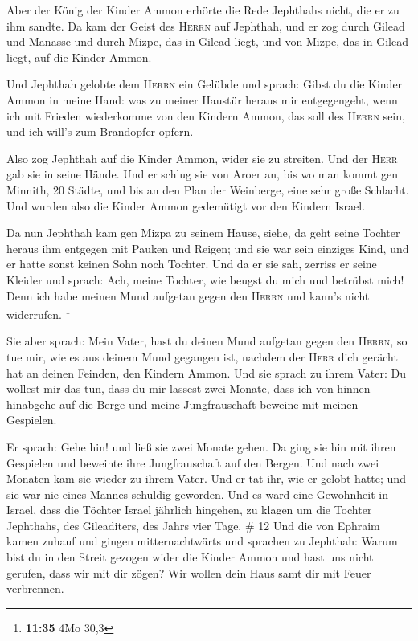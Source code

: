  Aber der König der Kinder Ammon erhörte die Rede
Jephthahs nicht, die er zu ihm sandte.  Da kam der Geist
des \textsc{Herrn} auf Jephthah, und er zog durch Gilead und Manasse und
durch Mizpe, das in Gilead liegt, und von Mizpe, das in Gilead liegt,
auf die Kinder Ammon.

 Und Jephthah gelobte dem \textsc{Herrn} ein Gelübde und
sprach: Gibst du die Kinder Ammon in meine Hand:  was zu
meiner Haustür heraus mir entgegengeht, wenn ich mit Frieden wiederkomme
von den Kindern Ammon, das soll des \textsc{Herrn} sein, und ich will's
zum Brandopfer opfern.

 Also zog Jephthah auf die Kinder Ammon, wider sie zu
streiten. Und der \textsc{Herr} gab sie in seine Hände. 
Und er schlug sie von Aroer an, bis wo man kommt gen Minnith, 20 Städte,
und bis an den Plan der Weinberge, eine sehr große Schlacht. Und wurden
also die Kinder Ammon gedemütigt vor den Kindern Israel.

 Da nun Jephthah kam gen Mizpa zu seinem Hause, siehe, da
geht seine Tochter heraus ihm entgegen mit Pauken und Reigen; und sie
war sein einziges Kind, und er hatte sonst keinen Sohn noch Tochter.
 Und da er sie sah, zerriss er seine Kleider und sprach:
Ach, meine Tochter, wie beugst du mich und betrübst mich! Denn ich habe
meinen Mund aufgetan gegen den \textsc{Herrn} und kann's nicht
widerrufen. \footnote{\textbf{11:35} 4Mo 30,3}

 Sie aber sprach: Mein Vater, hast du deinen Mund
aufgetan gegen den \textsc{Herrn}, so tue mir, wie es aus deinem Mund
gegangen ist, nachdem der \textsc{Herr} dich gerächt hat an deinen
Feinden, den Kindern Ammon.  Und sie sprach zu ihrem
Vater: Du wollest mir das tun, dass du mir lassest zwei Monate, dass ich
von hinnen hinabgehe auf die Berge und meine Jungfrauschaft beweine mit
meinen Gespielen.

 Er sprach: Gehe hin! und ließ sie zwei Monate gehen. Da
ging sie hin mit ihren Gespielen und beweinte ihre Jungfrauschaft auf
den Bergen.  Und nach zwei Monaten kam sie wieder zu
ihrem Vater. Und er tat ihr, wie er gelobt hatte; und sie war nie eines
Mannes schuldig geworden. Und es ward eine Gewohnheit in Israel,
 dass die Töchter Israel jährlich hingehen, zu klagen um
die Tochter Jephthahs, des Gileaditers, des Jahrs vier Tage. \# 12
 Und die von Ephraim kamen zuhauf und gingen
mitternachtwärts und sprachen zu Jephthah: Warum bist du in den Streit
gezogen wider die Kinder Ammon und hast uns nicht gerufen, dass wir mit
dir zögen? Wir wollen dein Haus samt dir mit Feuer verbrennen.

